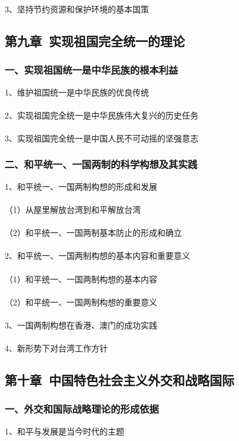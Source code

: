 \documentclass{ctexart}
\begin{document}
3、坚持节约资源和保护环境的基本国策

\subsection{第九章\ 实现祖国完全统一的理论}
\subsubsection{一、实现祖国统一是中华民族的根本利益}
1、维护祖国统一是中华民族的优良传统
\\\\

2、实现祖国完全统一是中华民族伟大复兴的历史任务
\\\\

3、实现祖国完全统一是中国人民不可动摇的坚强意志

\subsubsection{二、和平统一、一国两制的科学构想及其实践}
1、和平统一、一国两制构想的形成和发展
\\\\
（1）从屋里解放台湾到和平解放台湾
\\\\
（2）和平统一、一国两制基本防止的形成和确立
\\\\

2、和平统一、一国两制构想的基本内容和重要意义
\\\\
（1）和平统一、一国两制构想的基本内容
\\\\
（2）和平统一、一国两制构想的重要意义
\\\\

3、一国两制构想在香港、澳门的成功实践
\\\\

4、新形势下对台湾工作方针

\subsection{第十章\ 中国特色社会主义外交和战略国际}
\subsubsection{一、外交和国际战略理论的形成依据}
1、和平与发展是当今时代的主题
\\\\
\end{document}
